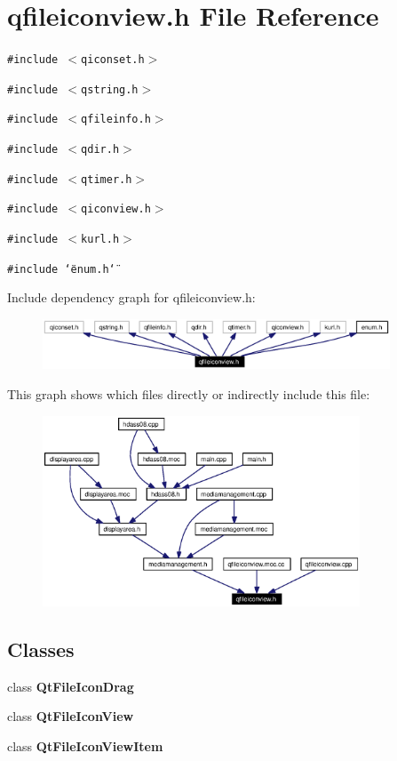 \section{qfileiconview.h File Reference}
\label{qfileiconview_8h}


{\tt \#include $<$qiconset.h$>$}\par
{\tt \#include $<$qstring.h$>$}\par
{\tt \#include $<$qfileinfo.h$>$}\par
{\tt \#include $<$qdir.h$>$}\par
{\tt \#include $<$qtimer.h$>$}\par
{\tt \#include $<$qiconview.h$>$}\par
{\tt \#include $<$kurl.h$>$}\par
{\tt \#include \char`\"{}enum.h\char`\"{}}\par


Include dependency graph for qfileiconview.h:\begin{figure}[H]
\begin{center}
\leavevmode
\includegraphics[width=293pt]{qfileiconview_8h__incl}
\end{center}
\end{figure}


This graph shows which files directly or indirectly include this file:\begin{figure}[H]
\begin{center}
\leavevmode
\includegraphics[width=268pt]{qfileiconview_8h__dep__incl}
\end{center}
\end{figure}
\subsection*{Classes}
\begin{CompactItemize}
\item 
class {\bf Qt\-File\-Icon\-Drag}
\item 
class {\bf Qt\-File\-Icon\-View}
\item 
class {\bf Qt\-File\-Icon\-View\-Item}
\end{CompactItemize}
